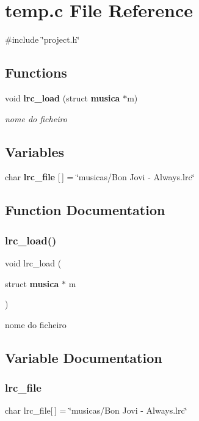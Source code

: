 \section{temp.\+c File Reference}
\label{temp_8c}
{\ttfamily \#include \char`\"{}project.\+h\char`\"{}}\newline
\subsection*{Functions}
\begin{DoxyCompactItemize}
\item 
void \textbf{ lrc\+\_\+load} (struct \textbf{ musica} $\ast$m)
\begin{DoxyCompactList}\small\item\em nome do ficheiro \end{DoxyCompactList}\end{DoxyCompactItemize}
\subsection*{Variables}
\begin{DoxyCompactItemize}
\item 
char \textbf{ lrc\+\_\+file} [$\,$] = \char`\"{}musicas/Bon Jovi -\/ Always.\+lrc\char`\"{}
\end{DoxyCompactItemize}


\subsection{Function Documentation}
\mbox{\label{temp_8c_a0c43d8e1a93bdb19f97c4d8d1b214643}} 
\subsubsection{lrc\_load()}
{\footnotesize\ttfamily void lrc\+\_\+load (\begin{DoxyParamCaption}\item[{struct \textbf{ musica} $\ast$}]{m }\end{DoxyParamCaption})}



nome do ficheiro 



\subsection{Variable Documentation}
\mbox{\label{temp_8c_a6bdee275ef83c0d0cda5fef9f676def6}} 
\subsubsection{lrc\_file}
{\footnotesize\ttfamily char lrc\+\_\+file[$\,$] = \char`\"{}musicas/Bon Jovi -\/ Always.\+lrc\char`\"{}}


